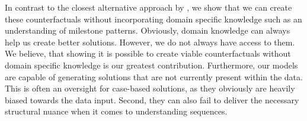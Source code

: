 \documentclass[./../../paper.tex]{subfiles}
\begin{document}
In contrast to the closest alternative approach by \citeauthor{hsieh_DiCE4ELInterpretingProcess_2021}, we show that we can create these counterfactuals without incorporating domain specific knowledge such as an understanding of milestone patterns. Obviously, domain knowledge can always help us create better solutions. However, we do not always have access to them. We believe, that showing it is possible to create viable counterfactuals without domain specific knowledge is our greatest contribution. Furthermore, our models are capable of generating solutions that are not currently present within the data. This is often an oversight for case-based solutions, as they obviously are heavily biased towards the data input. Second, they can also fail to deliver the necessary structural nuance when it comes to understanding sequences.
\end{document}
